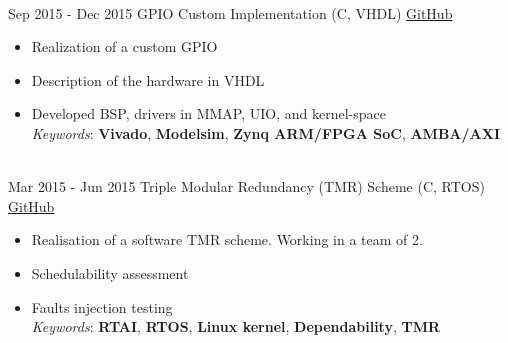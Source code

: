 \documentclass[letterpaper]{twentysecondcv} %
\begin{document}
\begin{twenty}
{\begin{itemize}
		    \end{itemize}
        }\\
    \twentyitem
    	{Sep 2015 -}
		{Dec 2015}
        {GPIO Custom Implementation (C, VHDL)}
        {\href{https://github.com/artic92/gpio-zynq-7000}{GitHub}}
        {}
        {
            \begin{itemize}
                \item Realization of a custom GPIO
                \item Description of the hardware in VHDL
                \item Developed BSP, drivers in MMAP, UIO, and kernel-space \\
                \textit{Keywords}: \textbf{Vivado}, \textbf{Modelsim}, \textbf{Zynq ARM/FPGA SoC}, \textbf{AMBA/AXI}
		    \end{itemize}
        }\\
    \twentyitem
    	{Mar 2015 -}
		{Jun 2015}
        {Triple Modular Redundancy (TMR) Scheme (C, RTOS)}
        {\href{https://github.com/artic92/tmr_rtai}{GitHub}}
        {}
        {
        {
            \begin{itemize}
                \item Realisation of a software TMR scheme. Working in a team of 2.
                \item Schedulability assessment
                \item Faults injection testing \\
                \textit{Keywords}: \textbf{RTAI}, \textbf{RTOS}, \textbf{Linux kernel}, \textbf{Dependability}, \textbf{TMR}
		    \end{itemize}
		}
        }
\end{twenty}

\end{document}
